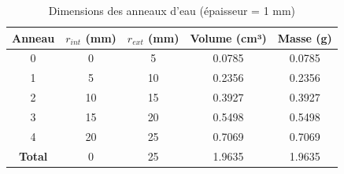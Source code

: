 \documentclass[11pt,a4paper]{article}
\begin{document}
\begin{table}[h]
\centering
\begin{tabular}{ccccc}
\toprule
\rowcolor{headerblue!20}
\textbf{Anneau} & \textbf{$r_{int}$ (mm)} & \textbf{$r_{ext}$ (mm)} & \textbf{Volume (cm³)} & \textbf{Masse (g)} \\
\midrule
0 & 0 & 5 & 0.0785 & 0.0785 \\
\rowcolor{lightgray}
1 & 5 & 10 & 0.2356 & 0.2356 \\
2 & 10 & 15 & 0.3927 & 0.3927 \\
\rowcolor{lightgray}
3 & 15 & 20 & 0.5498 & 0.5498 \\
4 & 20 & 25 & 0.7069 & 0.7069 \\
\midrule
\textbf{Total} & 0 & 25 & 1.9635 & 1.9635 \\
\bottomrule
\end{tabular}
\caption{Dimensions des anneaux d'eau (épaisseur = 1 mm)}
\end{table}
\end{document}
